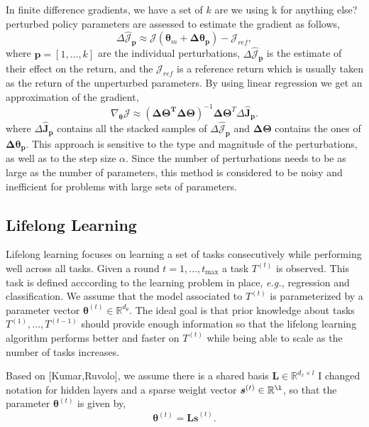 \documentclass{aamas2016}
\renewcommand{\Re}{\mathbb{R}}
\begin{document}
In finite difference gradients, we have a set of $k$ {\color{red} are we using k for anything else?} perturbed policy parameters are
assessed to estimate the gradient as follows,
\begin{displaymath}
 \Delta\hat{\mathcal{J}}_{\mathbf{p}} \approx \mathcal{J}(\boldsymbol{\theta}_{m}+\boldsymbol{\Delta\theta_{p}}) - \mathcal{J}_{ref},
\end{displaymath}
where $\mathbf{p}=[1,\ldots,k]$ are the individual perturbations, $\Delta\hat{\mathcal{J}}_{\mathbf{p}}$ is the estimate of their 
effect on the return, and the $\mathcal{J}_{ref}$ is a reference return which is usually taken as the return of the unperturbed
parameters. By using linear regression we get an approximation of the gradient,
\begin{displaymath}
 \nabla_{\boldsymbol{\theta}}\mathcal{J} \approx \left(\boldsymbol{\Delta\Theta^{T}\Delta\Theta}\right)^{-1}\boldsymbol{\Delta\Theta}^{T}\Delta\boldsymbol{\hat{J}_{p}}.
\end{displaymath}
where $\Delta\boldsymbol{\hat{J}_{p}}$ contains all the stacked samples of $\Delta\hat{\mathcal{J}}_{\mathbf{p}}$ and  $\boldsymbol{\Delta\Theta}$
contains the ones of $\boldsymbol{\Delta\theta_{p}}$. This approach is sensitive to the type and magnitude of the perturbations, as well as
to the step size $\alpha$. Since the number of perturbations needs to be as large as the number of parameters, this method is
considered to be noisy and inefficient for problems with large sets of parameters.

\subsection{Lifelong Learning}

Lifelong learning focuses on learning a set of tasks consecutively while performing well across all tasks. Given a round 
$t = 1,\dots,t_{\max}$ a task $T^{(t)}$ is observed. This task is defined acccording to the learning problem in place, \emph{e.g.,}
regression and classification. We assume that the model associated to $T^{(t)}$ is parameterized
by a parameter vector $\boldsymbol{\theta}^{(t)} \in \Re^{d_{\theta}}$. The ideal goal is that prior knowledge about tasks 
$T^{(1)},\ldots,T^{(t-1)}$ should provide enough information so that the lifelong learning algorithm performs better and faster on $T^{(t)}$
while being able to scale as the number of tasks increases.

Based on [Kumar,Ruvolo], we assume there is a shared basis $\boldsymbol{L}\in \Re^{d_{x}\times l}$ {\color{red} I changed notation 
for hidden layers} and a sparse weight vector $\boldsymbol{s}^{(t)}\in \Re^{\l}$, so that the parameter $\boldsymbol{\theta}^{(t)}$
is given by,
\begin{displaymath}
 \boldsymbol{\theta}^{(t)}=\boldsymbol{Ls}^{(t)}.
\end{displaymath}
\end{document}
